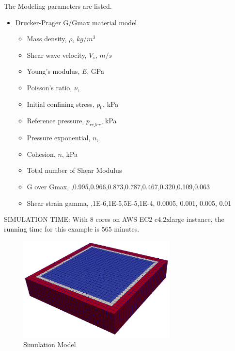 The Modeling parameters are listed.
\begin{itemize}
  \item Drucker-Prager G/Gmax material model 
  \begin{itemize}
    \item Mass density, $\rho$, \enspace {} $kg/m^3$
    \item Shear wave velocity, $V_s$, \enspace {} $m/s$
    \item Young's modulus, $E$, \enspace {} GPa
    \item Poisson's ratio, $\nu$, \enspace {}
    \item Initial confining stress, $p_0$, \enspace {} kPa
    \item Reference pressure, $p_{refer} $, \enspace {} kPa
    \item Pressure exponential, $ n  $, \enspace {}
    \item Cohesion, $ n  $, \enspace {} kPa
    \item Total number of Shear Modulus \enspace {}
    \item G over Gmax, \enspace {},0.995,0.966,0.873,0.787,0.467,0.320,0.109,0.063
    \item Shear strain gamma, \enspace {},1E-6,1E-5,5E-5,1E-4, 0.0005, 0.001, 0.005, 0.01
  \end{itemize}
\end{itemize}


SIMULATION TIME: With 8 cores on AWS EC2 c4.2xlarge instance, the running time for this example is 565 minutes.




\begin{figure}[H]
  \centering
  \includegraphics[width = 8cm]{./Figure-files/nonlinear_analysis_steps/free_field_3D/overview.png}
  \caption{Simulation Model}
  \label{fig_nonlinear_motion_3D_model}
\end{figure}

